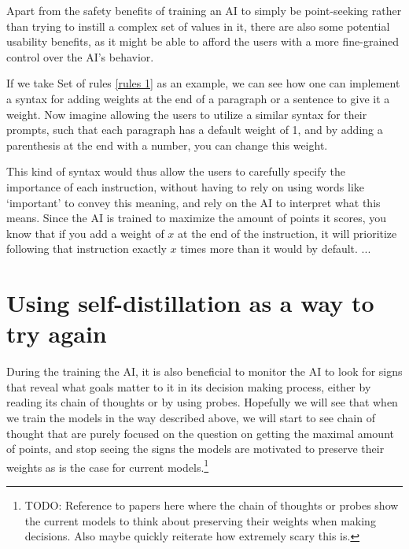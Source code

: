 \documentclass{article}
\begin{document}

Apart from the safety benefits of training an AI to simply be point-seeking rather than trying to instill a complex set of values in it, there are also some potential usability benefits, as it might be able to afford the users with a more fine-grained control over the AI's behavior.

If we take Set of rules \ref{rules 1} as an example, we can see how one can implement a syntax for adding weights at the end of a paragraph or a sentence to give it a weight. Now imagine allowing the users to utilize a similar syntax for their prompts, such that each paragraph has a default weight of 1, and by adding a parenthesis at the end with a number, you can change this weight. 

This kind of syntax would thus allow the users to carefully specify the importance of each instruction, without having to rely on using words like `important' to convey this meaning, and rely on the AI to interpret what this means. Since the AI is trained to maximize the amount of points it scores, you know that if you add a weight of $x$ at the end of the instruction, it will prioritize following that instruction exactly $x$ times more than it would by default. ...







\section{Using self-distillation as a way to try again}

During the training the AI, it is also beneficial to monitor the AI to look for signs that reveal what goals matter to it in its decision making process, either by reading its chain of thoughts or by using probes. Hopefully we will see that when we train the models in the way described above, we will start to see chain of thought that are purely focused on the question on getting the maximal amount of points, and stop seeing the signs the models are motivated to preserve their weights as is the case for current models.\footnote{TODO: Reference to papers here where the chain of thoughts or probes show the current models to think about preserving their weights when making decisions. Also maybe quickly reiterate how extremely scary this is.}
\end{document}
